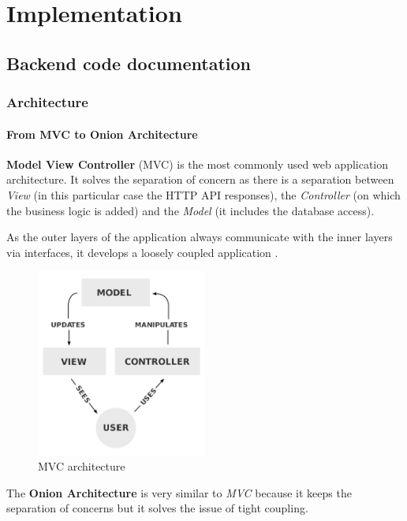 \chapter{Implementation}

\section{Backend code documentation}
    \subsection{Architecture}
        \subsubsection{From MVC to Onion Architecture}
            \textbf{Model View Controller} (MVC) is the most commonly used web application architecture. 
            It solves the separation of concern as there is a separation between \textit{View} (in this particular case the HTTP API responses), 
            the \textit{Controller} (on which the business logic is added) and the \textit{Model} (it includes the database access).

            As the outer layers of the application always communicate with the inner layers via interfaces, it develops a loosely coupled application \cite{benyusouf}.

            \begin{figure}[H]
                \centering
                    \includegraphics[width=0.5\textwidth]{assets/mvc.png}
                \caption{MVC architecture \cite{MVC}}
                \label{fig:implementation_mvc}
            \end{figure}

            The \textbf{Onion Architecture} is very similar to \textit{MVC} because it keeps the separation of concerns but it solves the issue of tight coupling.

